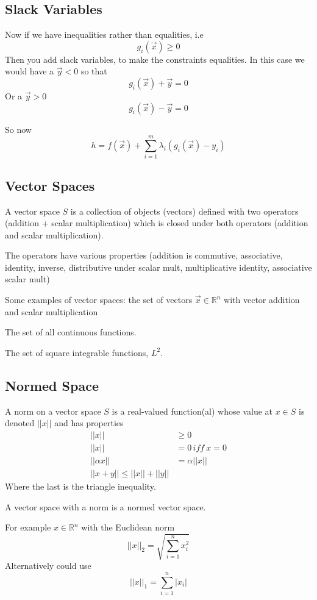\documentclass{X:/Documents/Coding/Latex/myassignment}
\begin{document}
\subsection{Slack Variables}
Now if we have inequalities rather than equalities, i.e
\[g_i(\vec x) \geq 0\]
Then you add slack variables, to make the constraints equalities. 
In this case we would have a $\vec y < 0$ so that
\[g_i(\vec x) + \vec y = 0\]
Or a $\vec y > 0$
\[g_i(\vec x) - \vec y = 0\]

So now
\[h = f(\vec x) + \sum_{i=1}^m \lambda_i (g_i (\vec x) - y_i)\]


\subsection{Vector Spaces}
A vector space $S$ is a collection of objects (vectors) defined with two operators (addition + scalar multiplication) which is closed under both operators (addition and scalar multiplication).

The operators have various properties (addition is commutive, associative, identity, inverse, distributive under scalar mult, multiplicative identity, associative scalar mult) 

Some examples of vector spaces: 
the set of vectors $\vec x \in \mathbb{R}^{n}$ with vector addition and scalar multiplication

The set of all continuous functions.

The set of square integrable functions, $L^2$.


\subsection{Normed Space}
A norm on a vector space $S$ is a real-valued function(al) whose value at $x \in S$ is denoted $||x||$ and has properties
\begin{align*}
	||x||& \geq 0\\
	||x||& = 0\, iff \ x=0\\
	||\alpha x|| &= \alpha ||x||\\
	||x + y|| \leq ||x|| + ||y||
\end{align*}
Where the last is the triangle inequality.

A vector space with a norm is a normed vector space.

For example $x \in \mathbb{R}^n$ with the Euclidean norm
\[||x||_2 = \sqrt{\sum_{i=1}^n x_i^2}\]
Alternatively could use
\[||x||_1 = \sum_{i=1}^n |x_i|\]
\end{document}

